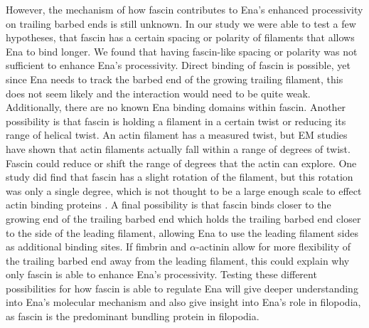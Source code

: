 However, the mechanism of how fascin contributes to Ena's enhanced processivity on trailing barbed ends is still unknown. In our study we were able to test a few hypotheses, that fascin has a certain spacing or polarity of filaments that allows Ena to bind longer. We found that having fascin-like spacing or polarity was not sufficient to enhance Ena's processivity. Direct binding of fascin is possible, yet since Ena needs to track the barbed end of the growing trailing filament, this does not seem likely and the interaction would need to be quite weak. Additionally, there are no known Ena binding domains within fascin. Another possibility is that fascin is holding a filament in a certain twist or reducing its range of helical twist. An actin filament has a measured twist, but EM studies have shown that actin filaments actually fall within a range of degrees of twist. Fascin could reduce or shift the range of degrees that the actin can explore. One study did find that fascin has a slight rotation of the filament, but this rotation was only a single degree, which is not thought to be a large enough scale to effect actin binding proteins \citep{claessens_actin-binding_2006}. A final possibility is that fascin binds closer to the growing end of the trailing barbed end which holds the trailing barbed end closer to the side of the leading filament, allowing Ena to use the leading filament sides as additional binding sites. If fimbrin and $\alpha$-actinin allow for more flexibility of the trailing barbed end away from the leading filament, this could explain why only fascin is able to enhance Ena's processivity. Testing these different possibilities for how fascin is able to regulate Ena will give deeper understanding into Ena's molecular mechanism and also give insight into Ena's role in filopodia, as fascin is the predominant bundling protein in filopodia.


